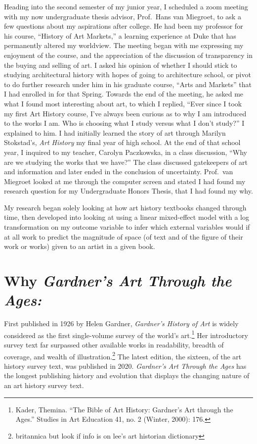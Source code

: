\documentclass[
  letterpaper,
  DIV=11,
  numbers=noendperiod]{scrreprt}
\begin{document}
Heading into the second semester of my junior year, I scheduled a zoom
meeting with my now undergraduate thesis advisor, Prof.~Hans van
Miegroet, to ask a few questions about my aspirations after college. He
had been my professor for his course, ``History of Art Markets,'' a
learning experience at Duke that has permanently altered my worldview.
The meeting began with me expressing my enjoyment of the course, and the
appreciation of the discussion of transparency in the buying and selling
of art. I asked his opinion of whether I should stick to studying
architectural history with hopes of going to architecture school, or
pivot to do further research under him in his graduate course, ``Arts
and Markets'' that I had enrolled in for that Spring. Towards the end of
the meeting, he asked me what I found most interesting about art, to
which I replied, ``Ever since I took my first Art History course, I've
always been curious as to why I am introduced to the works I am. Who is
choosing what I study versus what I don't study?'' I explained to him. I
had initially learned the story of art through Marilyn Stokstad's,
\emph{Art History} my final year of high school. At the end of that
school year, I inquired to my teacher, Carolyn Paczkowska, in a class
discussion, ``Why are we studying the works that we have?'' The class
discussed gatekeepers of art and information and later ended in the
conclusion of uncertainty. Prof.~van Miegroet looked at me through the
computer screen and stated I had found my research question for my
Undergraduate Honors Thesis, that I had found my why.

My research began solely looking at how art history textbooks changed
through time, then developed into looking at using a linear mixed-effect
model with a log transformation on my outcome variable to infer which
external variables would if at all work to predict the magnitude of
space (of text and of the figure of their work or works) given to an
artist in a given book.

\hypertarget{why-gardners-art-through-the-ages}{%
\section{\texorpdfstring{Why \emph{Gardner's Art Through the
Ages:}}{Why Gardner's Art Through the Ages:}}\label{why-gardners-art-through-the-ages}}

First published in 1926 by Helen Gardner, \emph{Gardner's History of
Art} is widely considered as the first single-volume survey of the
world's art.\footnote{Kader, Themina. ``The Bible of Art History:
  Gardner's Art through the Ages.'' Studies in Art Education 41, no. 2
  (Winter, 2000): 176.} Her introductory survey text far surpassed other
available works in readability, breadth of coverage, and wealth of
illustration.\footnote{britannica but look if info is on lee's art
  historian dictionary} The latest edition, the sixteen, of the art
history survey text, was published in 2020. \emph{Gardner's Art Through
the Ages} has the longest publishing history and evolution that displays
the changing nature of an art history survey text.
\end{document}
